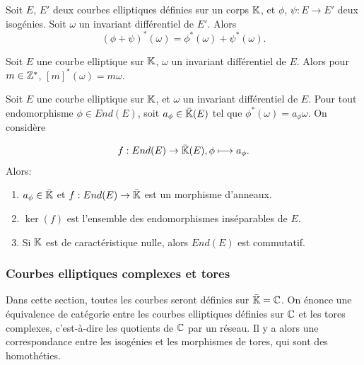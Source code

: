 \begin{The}
	Soit $E$, $E'$ deux courbes elliptiques définies sur un corps $\mathbb{K}$, et $\phi$, $\psi : E \rightarrow E'$ deux isogénies. Soit $\omega$ un invariant différentiel de $E'$. Alors
	\begin{equation*}
		\left( \phi + \psi\right) ^{*}\left( \omega\right) = \phi^{*}\left( \omega\right) + \psi^{*}\left( \omega\right).
	\end{equation*} 
\end{The}


\begin{Coro}
	Soit $E$ une courbe elliptique sur $\mathbb{K}$, $\omega$ un invariant différentiel de $E$. Alors pour $m\in\mathbb{Z}^{*}$,
	$[m]^{*}(\omega) = m\omega$. 
\end{Coro}


\begin{Coro}\label{LinéarisationEndomorphisme}
	
	Soit $E$ une courbe elliptique sur $\mathbb{K}$, et $\omega$ un invariant différentiel de $E$. Pour tout endomorphisme $\phi\in End(E)$, soit $a_{\phi}\in\bar{\mathbb{K}}(E)$ tel que $\phi^{*}(\omega) = a_{\phi}\omega$. On considère
	
	\begin{equation*}
		f : End(E)\rightarrow\bar{\mathbb{K}}(E) , \phi\longmapsto a_{\phi}.
	\end{equation*}
	Alors:
	\begin{enumerate}
		\item $a_{\phi}\in\bar{\mathbb{K}}$ et $f: End(E)\rightarrow\bar{\mathbb{K}}$ est un morphisme d'anneaux. 
		\item $\ker(f)$ est l'ensemble des endomorphismes inséparables de $E$.
		\item Si $\mathbb{K}$ est de caractéristique nulle, alors $End(E)$ est commutatif.
	\end{enumerate}
	
\end{Coro}



\subsubsection{Courbes elliptiques complexes et tores}

Dans cette section, toutes les courbes seront définies sur $\bar{\mathbb{K}} = \mathbb{C}$. On énonce une équivalence de catégorie entre les courbes elliptiques définies sur $\mathbb{C}$ et les tores complexes, c'est-à-dire les quotients de $\mathbb{C}$ par un réseau. Il y a alors une correspondance entre les isogénies et les morphismes de tores, qui sont des homothéties. 

